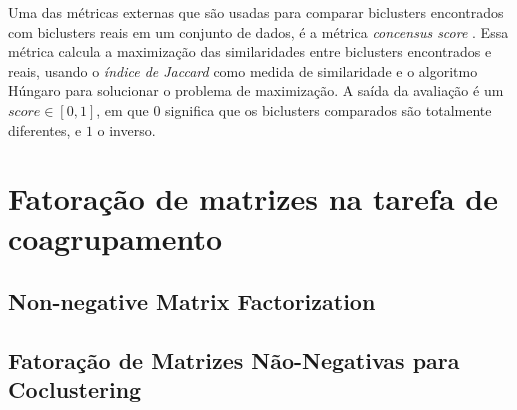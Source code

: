 \documentclass[
    12pt,                %
    oneside,            %
    a4paper,            %
    english,            %
    brazil                %
    ]{abntex2ppgsi}
\begin{document}
Uma das métricas externas que são usadas para comparar biclusters encontrados com biclusters reais em um conjunto de dados, é a métrica \textit{concensus score} \cite{Hochreiter2010}. Essa métrica calcula a maximização das similaridades entre biclusters encontrados e reais, usando o \textit{índice de Jaccard} como medida de similaridade e o algoritmo Húngaro para solucionar o problema de maximização. A saída da avaliação é um $\textit{score} \in [0,1]$, em que $0$ significa que os biclusters comparados são totalmente diferentes, e $1$ o inverso.


\chapter{Fatoração de matrizes na tarefa de coagrupamento}
\label{ch:fatoracao}


\section{Non-negative Matrix Factorization}


\section{Fatoração de Matrizes Não-Negativas para Coclustering}
\end{document}
